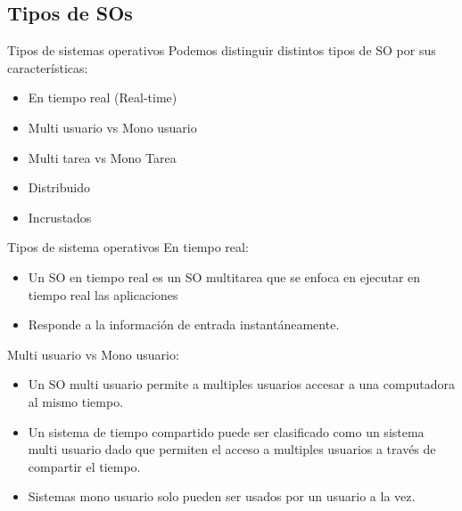 \documentclass[11pt]{beamer}
\begin{document}
	\subsection{Tipos de SOs}
		\begin{frame}{Tipos de sistemas operativos}
			Podemos distinguir distintos tipos de SO por sus características:
			\begin{itemize}
				\item En tiempo real (Real-time)
				\item Multi usuario vs Mono usuario
				\item Multi tarea vs Mono Tarea
				\item Distribuido
				\item Incrustados
			\end{itemize}
		\end{frame}
		\begin{frame}{Tipos de sistema operativos}
			En tiempo real:
			\begin{itemize}
				\item Un SO en tiempo real es un SO multitarea que se enfoca en ejecutar en tiempo real las aplicaciones
				\item Responde a la información de entrada instantáneamente.
			\end{itemize}
			Multi usuario vs Mono usuario:
			\begin{itemize}
				\item Un SO multi usuario permite a multiples usuarios accesar a una computadora al mismo tiempo.
				\item Un sistema de tiempo compartido puede ser clasificado como un sistema multi usuario dado que permiten el acceso a multiples usuarios a través de compartir el tiempo.
				\item Sistemas mono usuario solo pueden ser usados por un usuario a la vez.
			\end{itemize}
		\end{frame}
\end{document}
